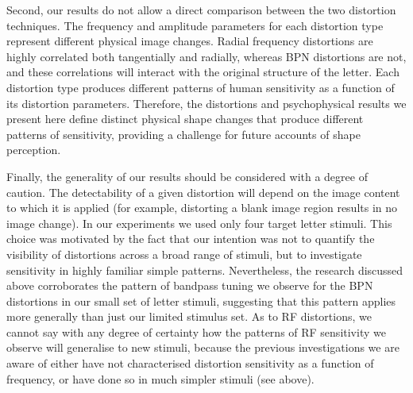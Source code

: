 \documentclass[doc, 11pt,a4paper,natbib]{apa6}\usepackage[]{graphicx}\usepackage[]{color}
\begin{document}
Second, our results do not allow a direct comparison between the two distortion techniques.
The frequency and amplitude parameters for each distortion type represent different physical image changes.
Radial frequency distortions are highly correlated both tangentially and radially, whereas BPN distortions are not, and these correlations will interact with the original structure of the letter.
Each distortion type produces different patterns of human sensitivity as a function of its distortion parameters.
Therefore, the distortions and psychophysical results we present here define distinct physical shape changes that produce different patterns of sensitivity, providing a challenge for future accounts of shape perception.

Finally, the generality of our results should be considered with a degree of caution.
The detectability of a given distortion will depend on the image content to which it is applied (for example, distorting a blank image region results in no image change).
In our experiments we used only four target letter stimuli.
This choice was motivated by the fact that our intention was not to quantify the visibility of distortions across a broad range of stimuli, but to investigate sensitivity in highly familiar simple patterns.
Nevertheless, the research discussed above \citep{bex_sensitivity_2010, wiecek_metamorphopsia_2014} corroborates the pattern of bandpass tuning we observe for the BPN distortions in our small set of letter stimuli, suggesting that this pattern applies more generally than just our limited stimulus set.
As to RF distortions, we cannot say with any degree of certainty how the patterns of RF sensitivity we observe will generalise to new stimuli, because the previous investigations we are aware of either have not characterised distortion sensitivity as a function of frequency, or have done so in much simpler stimuli (see above).
\end{document}
